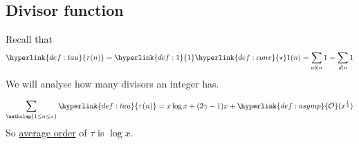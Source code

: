 \documentclass{article}
\newcommand{\bigO}{\mathcal{O}}
\begin{document}
\subsection{Divisor function}
Recall that
\begin{equation*}
\hyperlink{def:tau}{\tau(n)} = \hyperlink{def:1}{1} \hyperlink{def:conv}{\star} 1 (n) = \sum_{ab \mid n} 1 = \sum_{d \mid n} 1
\end{equation*}
We will analyse how many divisors an integer has.
\begin{nthm}\label{thm:4}
  \begin{align*}
    \sum_{\mathclap{1 \leq n \leq x}} \hyperlink{def:tau}{\tau(n)} = x \log x + (2 \gamma - 1) x + \hyperlink{def:asymp}{\bigO}(x^{\frac{1}{2}})
  \end{align*}
  So \hyperlink{def:averageOrder}{average order} of $\tau$ is $\log x$.
\end{nthm}
\end{document}
